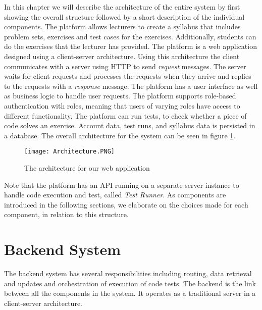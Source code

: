 In this chapter we will describe the architecture of the entire system by first showing the overall structure followed by a short description of the individual components.
The platform allows lecturers to create a syllabus that includes problem sets, exercises and test cases for the exercises. Additionally, students can do the exercises that the lecturer has provided.
The platform is a web application designed using a client-server architecture.  Using this architecture the client communicates with a server using HTTP to send \textit{request} messages. The server waits for client requests and processes the requests when they arrive and replies to the requests with a \textit{response} message. 
The platform has a user interface as well as business logic to handle user requests. The platform supports role-based authentication with roles, meaning that users of varying roles have access to different functionality. The platform can run tests, to check whether a piece of code solves an exercise. Account data, test runs, and syllabus data is persisted in a database.
The overall architecture for the system can be seen in figure \ref{fig:Architecture}.

\begin{figure}[H]
	\texttt{[image: Architecture.PNG]}
	\centering
	\caption{The architecture for our web application}
	\label{fig:Architecture}
\end{figure}
Note that the platform has an API running on a separate server instance to handle code execution and test, called \textit{Test Runner}. As components are introduced in the following sections, we elaborate on the choices made for each component, in relation to this structure.

\section{Backend System}
The backend system has several responsibilities including routing, data retrieval and updates and orchestration of execution of code tests. The backend is the link between all the components in the system. It operates as a traditional server in a client-server architecture. 

